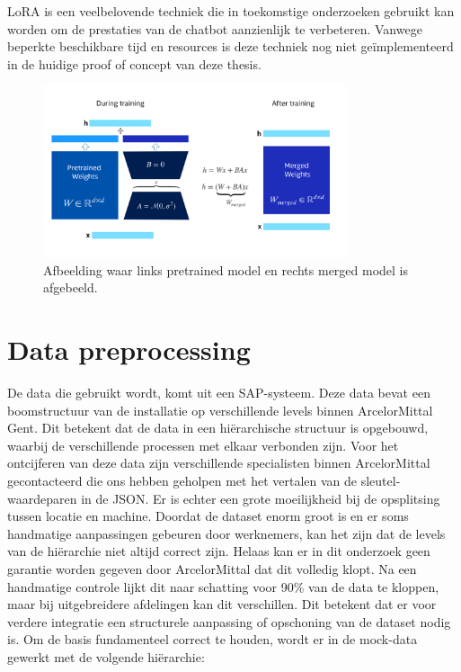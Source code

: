 LoRA is een veelbelovende techniek die in toekomstige onderzoeken gebruikt kan worden om de prestaties van de chatbot aanzienlijk te verbeteren. 
Vanwege beperkte beschikbare tijd en resources is deze techniek nog niet geïmplementeerd in de huidige proof of concept van deze thesis.

\begin{figure}[H]
     \centering
     \includegraphics[width=0.8\textwidth]{./img/lora.png}
     \caption[Lora principe.]{\label{fig:lora}Afbeelding waar links pretrained model en rechts merged model is afgebeeld.}
\end{figure}

\section{Data preprocessing}
De data die gebruikt wordt, komt uit een SAP-systeem. Deze data bevat een boomstructuur van de installatie op verschillende levels binnen ArcelorMittal Gent.
Dit betekent dat de data in een hiërarchische structuur is opgebouwd, waarbij de verschillende processen met elkaar verbonden zijn.
Voor het ontcijferen van deze data zijn verschillende specialisten binnen ArcelorMittal gecontacteerd die ons hebben geholpen met het vertalen van de sleutel-waardeparen in de JSON.\@
Er is echter een grote moeilijkheid bij de opsplitsing tussen locatie en machine. Doordat de dataset enorm groot is en er soms handmatige aanpassingen gebeuren door werknemers, kan het zijn dat de levels van de hiërarchie niet altijd correct zijn.
Helaas kan er in dit onderzoek geen garantie worden gegeven door ArcelorMittal dat dit volledig klopt. Na een handmatige controle lijkt dit naar schatting voor 90\% van de data te kloppen, maar bij uitgebreidere afdelingen kan dit verschillen.
Dit betekent dat er voor verdere integratie een structurele aanpassing of opschoning van de dataset nodig is.
Om de basis fundamenteel correct te houden, wordt er in de mock-data gewerkt met de volgende hiërarchie:

